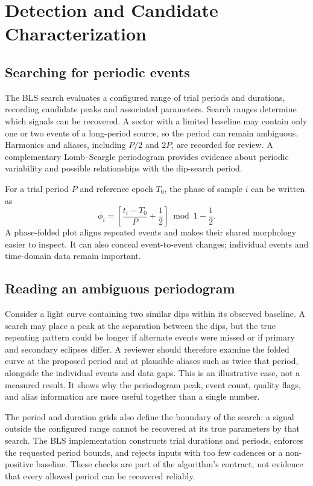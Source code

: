 \documentclass[11pt,a4paper]{article}
\begin{document}
\section{Detection and Candidate Characterization}
\subsection{Searching for periodic events}
The BLS search evaluates a configured range of trial periods and durations, recording candidate peaks and associated parameters. Search ranges determine which signals can be recovered. A sector with a limited baseline may contain only one or two events of a long-period source, so the period can remain ambiguous. Harmonics and aliases, including $P/2$ and $2P$, are recorded for review. A complementary Lomb--Scargle periodogram provides evidence about periodic variability and possible relationships with the dip-search period.

For a trial period $P$ and reference epoch $T_0$, the phase of sample $i$ can be written as
\begin{equation}
\phi_i=\left[\frac{t_i-T_0}{P}+\frac12\right]\bmod 1-\frac12.
\end{equation}
A phase-folded plot aligns repeated events and makes their shared morphology easier to inspect. It can also conceal event-to-event changes; individual events and time-domain data remain important.

\subsection{Reading an ambiguous periodogram}
Consider a light curve containing two similar dips within its observed baseline. A search may place a peak at the separation between the dips, but the true repeating pattern could be longer if alternate events were missed or if primary and secondary eclipses differ. A reviewer should therefore examine the folded curve at the proposed period and at plausible aliases such as twice that period, alongside the individual events and data gaps. This is an illustrative case, not a measured result. It shows why the periodogram peak, event count, quality flags, and alias information are more useful together than a single number.

The period and duration grids also define the boundary of the search: a signal outside the configured range cannot be recovered at its true parameters by that search. The BLS implementation constructs trial durations and periods, enforces the requested period bounds, and rejects inputs with too few cadences or a non-positive baseline. These checks are part of the algorithm's contract, not evidence that every allowed period can be recovered reliably.
\end{document}
